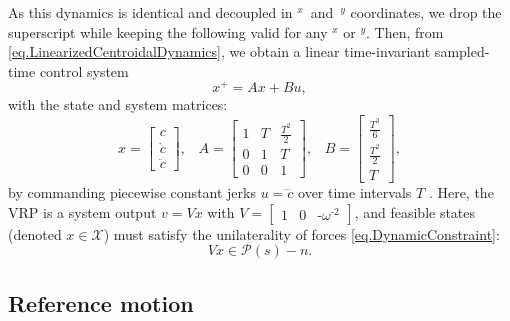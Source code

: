 \documentclass[letterpaper, 10 pt, conference]{ieeeconf}  %
\begin{document}
As this dynamics is identical and decoupled in $^{x}$~and~$^{y}$ coordinates, we drop the superscript while keeping the following valid for any $^x$ or $^y$.
Then, from \eqref{eq.LinearizedCentroidalDynamics}, we obtain a linear time-invariant sampled-time control system
\begin{equation}\label{eq.SystemDynamics}
x^{+} = Ax + Bu,
\end{equation}
%
with the state and system matrices:
%
\begin{equation}
x = \!\!\begin{bmatrix}
c\\\dot{c}\\ \ddot{c}
\end{bmatrix}\!\!,\;\;\;
A =\!\! \begin{bmatrix}
1&T&\frac{T^2}{2} \\
0&1&T \\
0&0&1
\end{bmatrix}\!\!,\;\;\;
B =\!\! \begin{bmatrix}
\frac{T^3}{6}\\
\frac{T^2}{2}\\
T
\end{bmatrix}\!\!, \label{eq.StateConstraint}
\end{equation}
%
by commanding piecewise constant jerks $ u = \dddot{c} $ over time intervals $T$ \cite[Chapter 5.5]{Ogata}. Here, the VRP is a system output $v=Vx$ with $V=\left[\begin{smallmatrix}1& 0 & \texttt{-}\omega^{\texttt{-}2} \end{smallmatrix}\right]$, and feasible states (denoted $x\in\mathcal{X}$) must satisfy the unilaterality of forces \eqref{eq.DynamicConstraint}:
\begin{equation}
    Vx\in \mathcal{P}(s) - n. \label{eq.DynamicalConstraint}
\end{equation}

\subsection{Reference motion}
\end{document}
